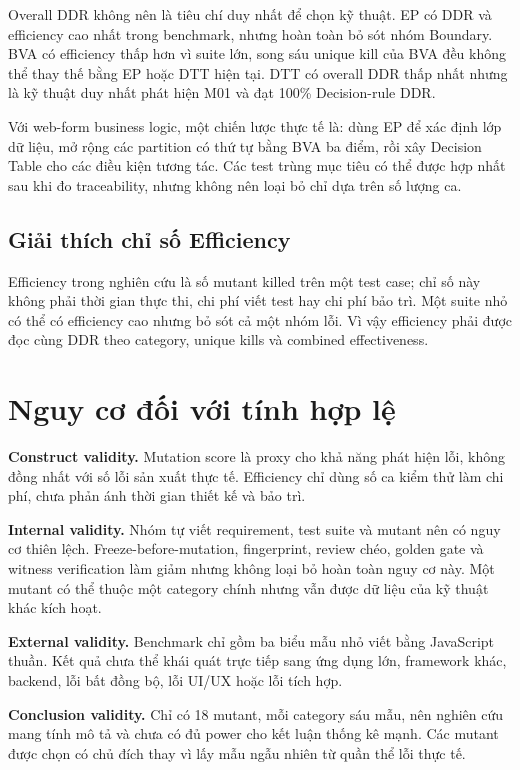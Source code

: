 \documentclass[runningheads]{llncs}
\begin{document}
Overall DDR không nên là tiêu chí duy nhất để chọn kỹ thuật. EP có DDR và efficiency cao nhất trong benchmark, nhưng hoàn toàn bỏ sót nhóm Boundary. BVA có efficiency thấp hơn vì suite lớn, song sáu unique kill của BVA đều không thể thay thế bằng EP hoặc DTT hiện tại. DTT có overall DDR thấp nhất nhưng là kỹ thuật duy nhất phát hiện M01 và đạt 100\% Decision-rule DDR.

Với web-form business logic, một chiến lược thực tế là: dùng EP để xác định lớp dữ liệu, mở rộng các partition có thứ tự bằng BVA ba điểm, rồi xây Decision Table cho các điều kiện tương tác. Các test trùng mục tiêu có thể được hợp nhất sau khi đo traceability, nhưng không nên loại bỏ chỉ dựa trên số lượng ca.

\subsection{Giải thích chỉ số Efficiency}

Efficiency trong nghiên cứu là số mutant killed trên một test case; chỉ số này không phải thời gian thực thi, chi phí viết test hay chi phí bảo trì. Một suite nhỏ có thể có efficiency cao nhưng bỏ sót cả một nhóm lỗi. Vì vậy efficiency phải được đọc cùng DDR theo category, unique kills và combined effectiveness.

\section{Nguy cơ đối với tính hợp lệ}
\label{sec:threats}

\textbf{Construct validity.} Mutation score là proxy cho khả năng phát hiện lỗi, không đồng nhất với số lỗi sản xuất thực tế. Efficiency chỉ dùng số ca kiểm thử làm chi phí, chưa phản ánh thời gian thiết kế và bảo trì.

\textbf{Internal validity.} Nhóm tự viết requirement, test suite và mutant nên có nguy cơ thiên lệch. Freeze-before-mutation, fingerprint, review chéo, golden gate và witness verification làm giảm nhưng không loại bỏ hoàn toàn nguy cơ này. Một mutant có thể thuộc một category chính nhưng vẫn được dữ liệu của kỹ thuật khác kích hoạt.

\textbf{External validity.} Benchmark chỉ gồm ba biểu mẫu nhỏ viết bằng JavaScript thuần. Kết quả chưa thể khái quát trực tiếp sang ứng dụng lớn, framework khác, backend, lỗi bất đồng bộ, lỗi UI/UX hoặc lỗi tích hợp.

\textbf{Conclusion validity.} Chỉ có 18 mutant, mỗi category sáu mẫu, nên nghiên cứu mang tính mô tả và chưa có đủ power cho kết luận thống kê mạnh. Các mutant được chọn có chủ đích thay vì lấy mẫu ngẫu nhiên từ quần thể lỗi thực tế.
\end{document}
